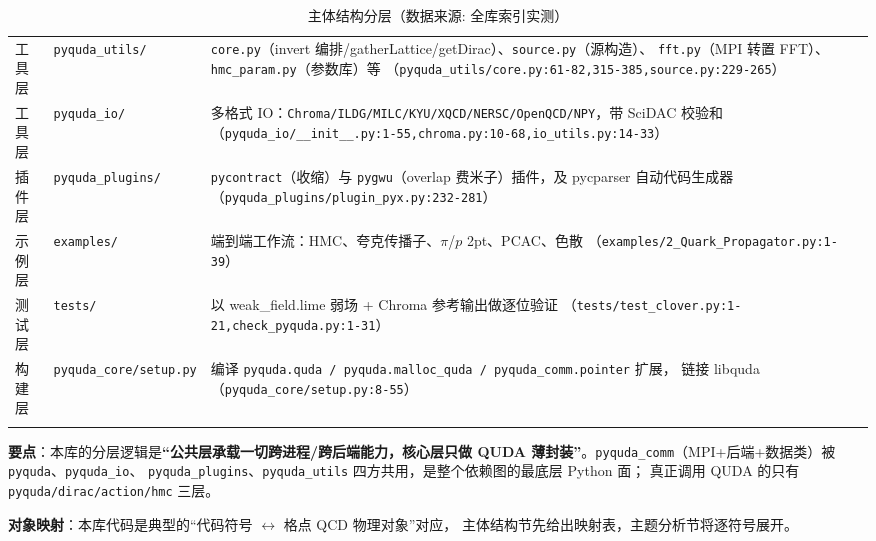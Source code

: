 \documentclass[UTF8]{ctexart}
\begin{document}
\begin{xltabular}{\textwidth}{llX}
工具层 & \texttt{\nolinkurl{pyquda_utils/}} &
\texttt{core.py}（invert 编排/gatherLattice/getDirac）、\texttt{source.py}（源构造）、
\texttt{fft.py}（MPI 转置 FFT）、\texttt{hmc\_param.py}（参数库）等
（\texttt{\nolinkurl{pyquda_utils/core.py:61-82,315-385,source.py:229-265}}）\\
工具层 & \texttt{\nolinkurl{pyquda_io/}} &
多格式 IO：\texttt{\nolinkurl{Chroma/ILDG/MILC/KYU/XQCD/NERSC/OpenQCD/NPY}}，带 SciDAC 校验和
（\texttt{\nolinkurl{pyquda_io/__init__.py:1-55,chroma.py:10-68,io_utils.py:14-33}}）\\
插件层 & \texttt{\nolinkurl{pyquda_plugins/}} &
\texttt{pycontract}（收缩）与 \texttt{pygwu}（overlap 费米子）插件，及 pycparser
自动代码生成器（\texttt{\nolinkurl{pyquda_plugins/plugin_pyx.py:232-281}}）\\
示例层 & \texttt{\nolinkurl{examples/}} &
端到端工作流：HMC、夸克传播子、$\pi$/$p$ 2pt、PCAC、色散
（\texttt{\nolinkurl{examples/2_Quark_Propagator.py:1-39}}）\\
测试层 & \texttt{\nolinkurl{tests/}} &
以 weak\_field.lime 弱场 + Chroma 参考输出做逐位验证
（\texttt{\nolinkurl{tests/test_clover.py:1-21,check_pyquda.py:1-31}}）\\
构建层 & \texttt{\nolinkurl{pyquda_core/setup.py}} &
编译 \texttt{pyquda.quda / pyquda.malloc\_quda / pyquda\_comm.pointer} 扩展，
链接 libquda（\texttt{\nolinkurl{pyquda_core/setup.py:8-55}}）\\
\bottomrule
\caption{主体结构分层（数据来源: 全库索引实测）}
\end{xltabular}

\begin{keybox}
\textbf{要点}：本库的分层逻辑是\textbf{“公共层承载一切跨进程/跨后端能力，核心层只做 QUDA
薄封装”}。\texttt{pyquda\_comm}（MPI+后端+数据类）被 \texttt{pyquda}、\texttt{pyquda\_io}、
\texttt{pyquda\_plugins}、\texttt{pyquda\_utils} 四方共用，是整个依赖图的最底层 Python 面；
真正调用 QUDA 的只有 \texttt{pyquda/dirac/action/hmc} 三层。
\end{keybox}

\textbf{对象映射}：本库代码是典型的“\textcolor{struct}{代码符号 $\leftrightarrow$ 格点 QCD 物理对象}”对应，
主体结构节先给出映射表，主题分析节将逐符号展开。
\end{document}
